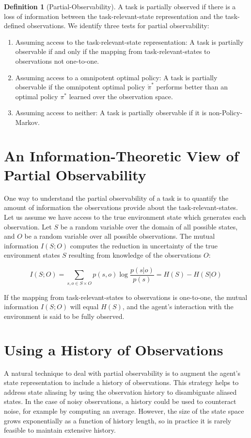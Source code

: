 \documentclass{article} %
\theoremstyle{definition}
\newtheorem{definition}{Definition}[section]
\begin{document}
\begin{definition}[Partial-Observability]
A task is partially observed if there is a loss of information between
the task-relevant-state representation and the task-defined
observations. We identify three tests for partial observability:
\begin{enumerate}
\item Assuming access to the task-relevant-state representation: A
  task is partially observable if and only if the mapping from
  task-relevant-states to observations not one-to-one.
\item Assuming access to a omnipotent optimal policy: A task is
  partially observable if the omnipotent optimal policy
  $\mathring{\pi}^*$ performs better than an optimal policy $\pi^*$
  learned over the observation space.
\item Assuming access to neither: A task is partially observable if it
  is non-Policy-Markov.
\end{enumerate}
\end{definition}

\section{An Information-Theoretic View of Partial Observability}
One way to understand the partial observability of a task is to
quantify the amount of information the observations provide about the
task-relevant-states. Let us assume we have access to the true
environment state which generates each observation. Let $S$ be a
random variable over the domain of all possible states, and $O$ be a
random variable over all possible observations. The mutual information
$I(S;O)$ computes the reduction in uncertainty of the true environment
states $S$ resulting from knowledge of the observations $O$:

\[
I(S;O) = \sum_{s,o \in S \times O} p(s,o) \log \frac{p(s|o)}{p(s)} = H(S) - H(S|O)
\]

If the mapping from task-relevant-states to observations is
one-to-one, the mutual information $I(S;O)$ will equal $H(S)$, and the
agent's interaction with the environment is said to be fully observed.

\section{Using a History of Observations}
A natural technique to deal with partial observability is to augment
the agent's state representation to include a history of
observations. This strategy helps to address state aliasing by using
the observation history to disambiguate aliased states. In the case of
noisy observations, a history could be used to counteract noise, for
example by computing an average. However, the size of the state space
grows exponentially as a function of history length, so in practice it
is rarely feasible to maintain extensive history.
\end{document}
